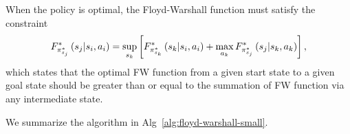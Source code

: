 When the policy is optimal, the Floyd-Warshall function must satisfy the constraint
%
\begin{align}
\fwargs{\state_i}{\act_i}{\state_j}{\policy^*_{\state_j}}{*}
 = \sup_{\state_k} \left[
  \fwargs{\state_i}{\act_i}{\state_k}{\policy^*_{\state_k}}{*}
  + \max_{\act_k}\fwargs{\state_k}{\act_k}{\state_j}{\policy^*_{\state_j}}{*} \right] ,
\end{align}%
%
which states that the optimal FW function from a given start state to a
given goal state should be greater than or equal to the summation of FW
function via any intermediate state. 

We summarize the algorithm in Alg~\ref{alg:floyd-warshall-small}.





